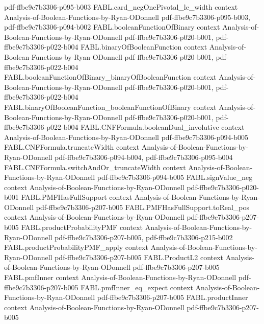 \begin{theorem}
  {pdf-ffbe9c7b3306-p095-b003}
\proofstep
  {FABL.card_negOnePivotal_le_width}
  {context}
  {Analysis-of-Boolean-Functions-by-Ryan-ODonnell}
  {pdf-ffbe9c7b3306-p095-b003,
    pdf-ffbe9c7b3306-p094-b002}
\proofstep
  {FABL.booleanFunctionOfBinary}
  {context}
  {Analysis-of-Boolean-Functions-by-Ryan-ODonnell}
  {pdf-ffbe9c7b3306-p020-b001,
    pdf-ffbe9c7b3306-p022-b004}
\proofstep
  {FABL.binaryOfBooleanFunction}
  {context}
  {Analysis-of-Boolean-Functions-by-Ryan-ODonnell}
  {pdf-ffbe9c7b3306-p020-b001,
    pdf-ffbe9c7b3306-p022-b004}
\proofstep
  {FABL.booleanFunctionOfBinary_binaryOfBooleanFunction}
  {context}
  {Analysis-of-Boolean-Functions-by-Ryan-ODonnell}
  {pdf-ffbe9c7b3306-p020-b001,
    pdf-ffbe9c7b3306-p022-b004}
\proofstep
  {FABL.binaryOfBooleanFunction_booleanFunctionOfBinary}
  {context}
  {Analysis-of-Boolean-Functions-by-Ryan-ODonnell}
  {pdf-ffbe9c7b3306-p020-b001,
    pdf-ffbe9c7b3306-p022-b004}
\proofstep
  {FABL.CNFFormula.booleanDual_involutive}
  {context}
  {Analysis-of-Boolean-Functions-by-Ryan-ODonnell}
  {pdf-ffbe9c7b3306-p094-b005}
\proofstep
  {FABL.CNFFormula.truncateWidth}
  {context}
  {Analysis-of-Boolean-Functions-by-Ryan-ODonnell}
  {pdf-ffbe9c7b3306-p094-b004,
    pdf-ffbe9c7b3306-p095-b004}
\proofstep
  {FABL.CNFFormula.switchAndOr_truncateWidth}
  {context}
  {Analysis-of-Boolean-Functions-by-Ryan-ODonnell}
  {pdf-ffbe9c7b3306-p094-b005}
\proofstep
  {FABL.signValue_neg}
  {context}
  {Analysis-of-Boolean-Functions-by-Ryan-ODonnell}
  {pdf-ffbe9c7b3306-p020-b001}
\proofstep
  {FABL.PMFHasFullSupport}
  {context}
  {Analysis-of-Boolean-Functions-by-Ryan-ODonnell}
  {pdf-ffbe9c7b3306-p207-b005}
\proofstep
  {FABL.PMFHasFullSupport.toReal_pos}
  {context}
  {Analysis-of-Boolean-Functions-by-Ryan-ODonnell}
  {pdf-ffbe9c7b3306-p207-b005}
\proofstep
  {FABL.productProbabilityPMF}
  {context}
  {Analysis-of-Boolean-Functions-by-Ryan-ODonnell}
  {pdf-ffbe9c7b3306-p207-b005,
    pdf-ffbe9c7b3306-p215-b002}
\proofstep
  {FABL.productProbabilityPMF_apply}
  {context}
  {Analysis-of-Boolean-Functions-by-Ryan-ODonnell}
  {pdf-ffbe9c7b3306-p207-b005}
\proofstep
  {FABL.ProductL2}
  {context}
  {Analysis-of-Boolean-Functions-by-Ryan-ODonnell}
  {pdf-ffbe9c7b3306-p207-b005}
\proofstep
  {FABL.pmfInner}
  {context}
  {Analysis-of-Boolean-Functions-by-Ryan-ODonnell}
  {pdf-ffbe9c7b3306-p207-b005}
\proofstep
  {FABL.pmfInner_eq_expect}
  {context}
  {Analysis-of-Boolean-Functions-by-Ryan-ODonnell}
  {pdf-ffbe9c7b3306-p207-b005}
\proofstep
  {FABL.productInner}
  {context}
  {Analysis-of-Boolean-Functions-by-Ryan-ODonnell}
  {pdf-ffbe9c7b3306-p207-b005}

\end{theorem}
